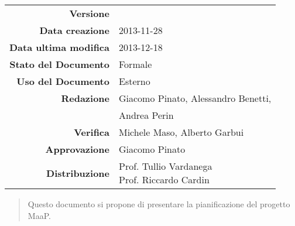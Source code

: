 

\newcommand{\Versione}{\versionePianoDiProgetto{}}	%
\newcommand{\Data}{2013-11-28}						%
\newcommand{\DataUltimaModifica}{2013-12-18}
\newcommand{\TipoDocumento}{Piano di Progetto}		%




\begin{center}
\begin{tabular}{r|l}
\textbf{Versione} & \Versione{} \\
\textbf{Data creazione} & \Data{} \\
\textbf{Data ultima modifica} & \DataUltimaModifica{} \\
\textbf{Stato del Documento} & Formale \\		%
\textbf{Uso del Documento} & Esterno \\			%
\textbf{Redazione} & Giacomo Pinato, Alessandro Benetti,\\			%
				   & Andrea Perin\\
\textbf{Verifica} & Michele Maso, Alberto Garbui\\				%
\textbf{Approvazione} & Giacomo Pinato\\				%
\textbf{Distribuzione} & \parbox[t]{4cm}{Prof. Tullio Vardanega \\ Prof. Riccardo Cardin \\ \Prop{} }\\
\end{tabular}
\end{center}

\vspace{0.05in}

\begin{abstract}
\begin{center}
Questo documento si propone di presentare la pianificazione del progetto MaaP.
\end{center}
\end{abstract}

